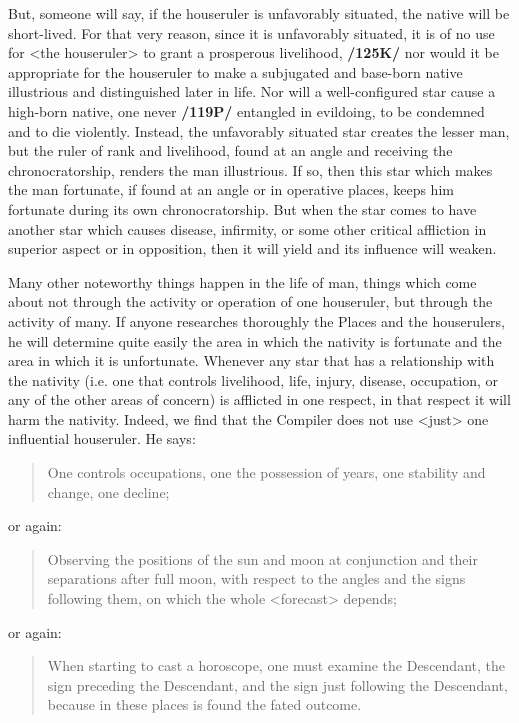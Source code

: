 But, someone will say, if the houseruler is unfavorably situated, the native will be short-lived. For that very reason, since it is unfavorably situated, it is of no use for <the houseruler> to grant a prosperous livelihood, \textbf{/125K/} nor would it be appropriate for the houseruler to make a subjugated and base-born native illustrious and distinguished later in life. Nor will a well-configured star cause a high-born native, one never \textbf{/119P/} entangled in evildoing, to be condemned and to die violently. Instead, the unfavorably situated star creates the lesser man, but the ruler of rank and livelihood, found at an angle and receiving the chronocratorship, renders the man illustrious. If so, then this star which makes the man fortunate, if found at an angle or in operative places, keeps him fortunate during its own chronocratorship. But when the star comes to have another star which causes disease, infirmity, or some other critical affliction in superior aspect or in opposition, then it will yield and its influence will weaken. 

Many other noteworthy things happen in the life of man, things which come about not through the activity or operation of one houseruler, but through the activity of many. If anyone researches thoroughly the Places and the houserulers, he will determine quite easily the area in which the nativity is fortunate and the area in which it is unfortunate. Whenever any star that has a relationship with the nativity (i.e. one that controls livelihood, life, injury, disease, occupation, or any of the other areas of concern) is afflicted in one respect, in that respect it will harm the nativity. Indeed, we
find that the Compiler does not use <just> one influential houseruler. He says: \begin{quote}One controls occupations, one the possession of years, one stability and change, one decline; \end{quote}
or again:
\begin{quote}Observing the positions of the sun and moon at conjunction and their separations after full moon, with
respect to the angles and the signs following them, on which the whole <forecast> depends;\end{quote}
or again:
\begin{quote}When starting to cast a horoscope, one must examine the Descendant, the sign preceding the Descendant,
and the sign just following the Descendant, because in these places is found the fated outcome.\end{quote}

